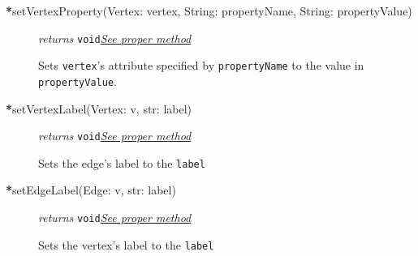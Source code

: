 \documentclass{article}
\newlength\q
\begin{document}
\begin{description}
\item[\textbf{*}setVertexProperty(Vertex: vertex, String: propertyName, String: propertyValue)] \emph{returns} \texttt{void}\quad \hyperref[setVertexPropertyClass]{\textit{See proper method}}


Sets \texttt{vertex}'s attribute specified by \texttt{propertyName} to the value in \texttt{propertyValue}.

\item[\textbf{*}setVertexLabel(Vertex: v, str: label)] \emph{returns} \texttt{void}\quad \hyperref[setVertexLabelClass]{\textit{See proper method}}

Sets the edge's label to the \texttt{label}

\item[\textbf{*}setEdgeLabel(Edge: v, str: label)] \emph{returns} \texttt{void}\quad \hyperref[setEdgeLabelClass]{\textit{See proper method}}

Sets the vertex's label to the \texttt{label}
  
\end{description}
\end{document}
